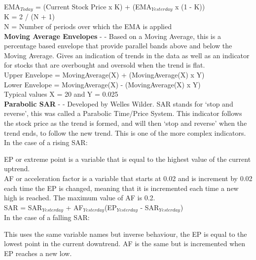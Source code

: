 \documentclass[conference]{IEEEtran}
\begin{document}
\noindent
EMA$_{Today}$ = (Current Stock Price x K) + (EMA$_{Yesterday}$ x (1 - K)) \\
K = 2 / (N + 1) \\
N = Number of periods over which the EMA is applied \\

\iffalse
[]
\fi

\noindent
\textbf{Moving Average Envelopes} - \cite{Murphy1999} - Based on a Moving Average, this is a percentage based envelope that provide parallel bands above and below the Moving Average. Gives an indication of trends in the data as well as an indicator for stocks that are overbought and oversold when the trend is flat.\\

\noindent
Upper Envelope = MovingAverage(X) + (MovingAverage(X) x Y)\\
Lower Envelope = MovingAverage(X) - (MovingAverage(X) x Y)\\
Typical values X = 20 and Y = 0.025\\

\iffalse
[]
\fi

\noindent
\textbf{Parabolic SAR} - \cite{Wilder1978} - Developed by Welles Wilder. SAR stands for `stop and reverse', this was called a Parabolic Time/Price System. This indicator follows the stock price as the trend is formed, and will then `stop and reverse' when the trend ends, to follow the new trend. This is one of the more complex indicators.\\

\noindent
In the case of a rising SAR:

\noindent
EP or extreme point is a variable that is equal to the highest value of the current uptrend.\\
AF or acceleration factor is a variable that starts at 0.02 and is increment by 0.02 each time the EP is changed, meaning that it is incremented each time a new high is reached. The maximum value of AF is 0.2. \\

\noindent
SAR = SAR$_{Yesterday}$ + AF$_{Yesterday}$(EP$_{Yesterday}$ - SAR$_{Yesterday}$) \\

\noindent
In the case of a falling SAR:

\noindent
This uses the same variable names but inverse behaviour, the EP is equal to the lowest point in the current downtrend. AF is the same but is incremented when EP reaches a new low. \\
\end{document}
